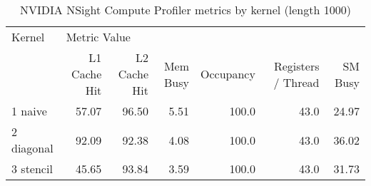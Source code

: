 \begin{table}[htbp]
\centering
\caption{NVIDIA NSight Compute Profiler metrics by kernel (length 1000)}
\label{prof_table_1000}
\begin{tabular}{lrrrrrr}
\toprule
    Kernel & \multicolumn{6}{l}{Metric Value} \\
           & L1 Cache Hit & L2 Cache Hit & Mem Busy & Occupancy & Registers / Thread & SM Busy \\
\midrule
   1 naive &        57.07 &        96.50 &     5.51 &     100.0 &               43.0 &   24.97 \\
2 diagonal &        92.09 &        92.38 &     4.08 &     100.0 &               43.0 &   36.02 \\
 3 stencil &        45.65 &        93.84 &     3.59 &     100.0 &               43.0 &   31.73 \\
\bottomrule
\end{tabular}
\end{table}
